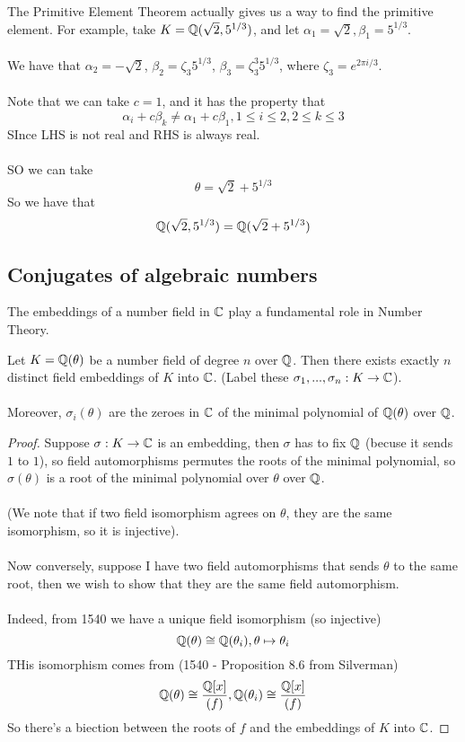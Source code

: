 \begin{example}[Page 35]
The Primitive Element Theorem actually gives us a way to find the primitive element. For example, take $K = \mathbb{Q}(\sqrt{2}, 5^{1/3})$, and let $\alpha_1 = \sqrt{2}, \beta_1 = 5^{1/3}$.\\\\
We have that $\alpha_2 = -\sqrt{2}$, $\beta_2 = \zeta_3 5^{1/3}$, $\beta_3 = \zeta_3^3 5^{1/3}$, where $\zeta_3 = e^{2\pi i /3}$.\\\\
Note that we can take $c = 1$, and it has the property that
\[\alpha_i + c\beta_k \neq \alpha_1 + c\beta_1, 1 \leq i \leq 2, 2 \leq k \leq 3\]
SInce LHS is not real and RHS is always real.\\\\
SO we can take
\[\theta = \sqrt{2} + 5^{1/3}\]
So we have that
\[\mathbb{Q}(\sqrt{2}, 5^{1/3}) = \mathbb{Q}(\sqrt{2} + 5^{1/3})\]
\end{example}

\subsection{Conjugates of algebraic numbers}

The embeddings of a number field in $\mathbb{C}$ play a fundamental role in Number Theory.

\begin{theorem}[Pg. 40]
Let $K = \mathbb{Q}(\theta)$ be a number field of degree $n$ over $\mathbb{Q}$. Then there exists exactly $n$ distinct field embeddings of $K$ into $\mathbb{C}$. (Label these $\sigma_1, ..., \sigma_n: K \to \mathbb{C}$).\\\\
Moreover, $\sigma_i(\theta)$ are the zeroes in $\mathbb{C}$ of the minimal polynomial of $\mathbb{Q}(\theta)$ over $\mathbb{Q}$.
\end{theorem}

\begin{proof}
Suppose $\sigma: K \to \mathbb{C}$ is an embedding, then $\sigma$ has to fix $\mathbb{Q}$ (becuse it sends $1$ to $1$), so field automorphisms permutes the roots of the minimal polynomial, so $\sigma(\theta)$ is a root of the minimal polynomial over $\theta$ over $\mathbb{Q}$.\\\\
(We note that if two field isomorphism agrees on $\theta$, they are the same isomorphism, so it is injective).\\\\
Now conversely, suppose I have two field automorphisms that sends $\theta$ to the same root, then we wish to show that they are the same field automorphism.\\\\
Indeed, from 1540 we have a unique field isomorphism (so injective)
\[\mathbb{Q}(\theta) \cong \mathbb{Q}(\theta_i), \theta \mapsto \theta_i\]
THis isomorphism comes from (1540 - Proposition 8.6 from Silverman)
\[\mathbb{Q}(\theta) \cong \frac{\mathbb{Q}[x]}{(f)}, \mathbb{Q}(\theta_i) \cong \frac{\mathbb{Q}[x]}{(f)}\]
So there's a biection between the roots of $f$ and the embeddings of $K$ into $\mathbb{C}$.
\end{proof}

